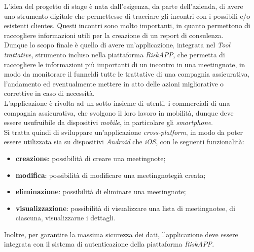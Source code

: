 L'idea del progetto di stage è nata dall'esigenza, da parte dell'azienda, di avere uno strumento digitale che permettesse di tracciare gli incontri con i possibili e/o esistenti \glspl{cliente}\glsoccur.
Questi incontri sono molto importanti, in quanto permettono di raccogliere informazioni utili per la creazione di un report di consulenza.\\
\indent Dunque lo scopo finale è quello di avere un'applicazione, integrata nel \emph{Tool trattative}, strumento incluso nella piattaforma \emph{RiskAPP}, che permetta di raccogliere le informazioni più importanti di un incontro in una \gls{meetingnote}\glsoccur, in modo da monitorare il \gls{funnel}\glsoccur di tutte le trattative di una compagnia assicurativa, l'andamento ed eventualmente mettere in atto delle azioni migliorative o correttive in caso di necessità.\\
\indent L'applicazione è rivolta ad un sotto insieme di utenti, i commerciali di una compagnia assicurativa, che svolgono il loro lavoro in mobilità, dunque deve essere usufruibile da dispositivi \emph{mobile}, in particolare gli \emph{smartphone}.\\
Si tratta quindi di sviluppare un'applicazione \emph{cross-platform}, in modo da poter essere utilizzata sia su dispositivi \emph{Android} che \emph{iOS}, con le seguenti funzionalità:
\begin{itemize}
    \item \textbf{creazione}: possibilità di creare una \gls{meetingnote}\glsoccur;
    \item \textbf{modifica}: possibilità di modificare una \gls{meetingnote}\glsoccur già creata;
    \item \textbf{eliminazione}: possibilità di eliminare una \gls{meetingnote};
    \item \textbf{visualizzazione}: possibilità di visualizzare una lista di \gls{meetingnote}\glsoccur e, di ciascuna, visualizzarne i dettagli.
\end{itemize}
Inoltre, per garantire la massima sicurezza dei dati, l'applicazione deve essere integrata con il sistema di autenticazione della piattaforma \emph{RiskAPP}.


    
